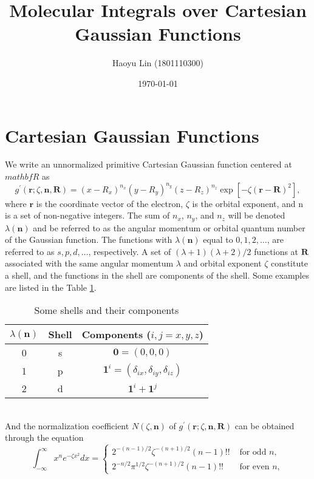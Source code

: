 \documentclass[11pt,a4paper]{article}
\title{Molecular Integrals over Cartesian Gaussian Functions}
\author{Haoyu Lin (1801110300)}
\date{\today}
\begin{document}
	
	\maketitle
	
	\section{Cartesian Gaussian Functions}
	We write an unnormalized primitive Cartesian Gaussian function centered at $mathbf{R}$ as
	\begin{equation}
		g^{\prime}(\mathbf{r}; \zeta, \mathbf{n}, \mathbf{R}) = \left(x-R_{x}\right)^{n_{x}} \left(y-R_{y}\right)^{n_{y}} \left(z-R_{z}\right)^{n_{z}} \exp \left[ -\zeta (\mathbf{r} - \mathbf{R})^2 \right],
	\end{equation}
	where $\mathbf{r}$ is the coordinate vector of the electron, $\zeta$ is the orbital exponent, and n is a set of non-negative integers. The sum of $n_{x}$, $n_{y}$, and $n_{z}$ will be denoted $\lambda(\mathbf{n})$ and be referred to as the angular momentum or orbital quantum number of the Gaussian function. The functions with $\lambda(\mathbf{n})$ equal to $0,1,2,\dots$, are referred to as $s,p,d,\dots$, respectively. A set of $(\lambda + 1) (\lambda + 2)/2$ functions at $\mathbf{R}$ associated with the same angular momentum $\lambda$ and orbital exponent $\zeta$ constitute a shell, and the functions in the shell are components of the shell. Some examples are listed in the Table \ref{table: 1}.
	\begin{table}[htbp]
		\caption{Some shells and their components} 
		\label{table: 1}
		\begin{center}
		\begin{tabular}{|c|c|c|}
			\hline
			$\lambda(\mathbf{n})$ & Shell & Components ($i,j = x,y,z$) \\ \hline
			0 & s & $\mathbf{0} = (0,0,0)$ \\ \hline
			1 & p & $\mathbf{1}^i = (\delta_{ix}, \delta_{iy}, \delta_{iz})$ \\ \hline
			2 & d & $\mathbf{1}^i + \mathbf{1}^j$ \\
			\hline
		\end{tabular} 
		\end{center}
	\end{table}
	\\And the normalization coefficient $N(\zeta, \mathbf{n})$ of $g^{\prime}(\mathbf{r}; \zeta, \mathbf{n}, \mathbf{R})$ can be obtained through the equation
	\begin{equation}
		\int_{-\infty}^{\infty} x^{n} e^{-\zeta x^{2}} d x = \left\{
		\begin{array}{ll}
			2^{-(n-1)/2} \zeta^{-(n+1)/2}(n-1)!! & {\text{    for odd } n,} \\
			2^{-n/2} \pi^{1/2} \zeta^{-(n+1)/2}(n-1)!! & {\text{    for even } n,}
		\end{array}\right.
		\label{eq: one-dimensional Gaussian integral}
	\end{equation}
\end{document}

